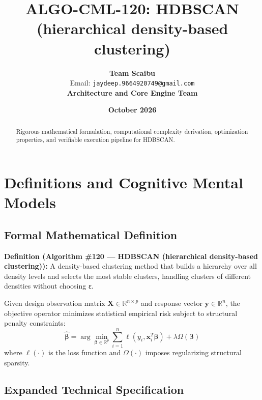 \documentclass[11pt,a4paper]{article}
\title{\textbf{ALGO-CML-120: HDBSCAN (hierarchical density-based clustering)}}
\author{\textbf{Team Scaibu} \\ \small Email: \texttt{jaydeep.9664920749@gmail.com} \\ \small \textbf{Architecture and Core Engine Team}}
\date{\textbf{October 2026}}
\theoremstyle{definition}
\begin{document}
\maketitle

\begin{abstract}
Rigorous mathematical formulation, computational complexity derivation, optimization properties, and verifiable execution pipeline for HDBSCAN.
\end{abstract}

\section{Definitions and Cognitive Mental Models}

\subsection{Formal Mathematical Definition}
\textbf{Definition (Algorithm \#120 --- HDBSCAN (hierarchical density-based clustering)):}
A density-based clustering method that builds a hierarchy over all density levels and selects the most stable clusters, handling clusters of different densities without choosing ε.

Given design observation matrix $\mathbf{X} \in \mathbb{R}^{n \times p}$ and response vector $\mathbf{y} \in \mathbb{R}^n$, the objective operator minimizes statistical empirical risk subject to structural penalty constraints:
\begin{equation}
\hat{\boldsymbol{\beta}} = \arg\min_{\boldsymbol{\beta} \in \mathbb{R}^p} \sum_{i=1}^n \ell(y_i, \mathbf{x}_i^T \boldsymbol{\beta}) + \lambda \Omega(\boldsymbol{\beta})
\end{equation}
where $\ell(\cdot)$ is the loss function and $\Omega(\cdot)$ imposes regularizing structural sparsity.

\subsection{Expanded Technical Specification}
\end{document}
